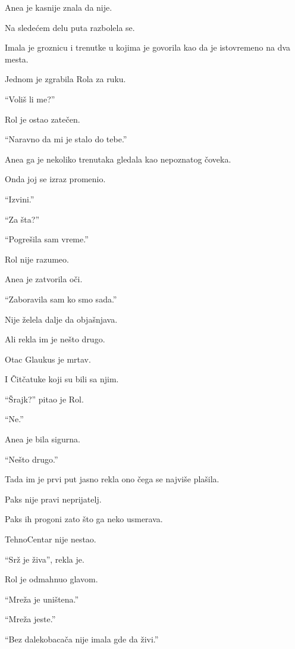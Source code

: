 Anea je kasnije znala da nije.

\bigskip

Na sledećem delu puta razbolela se.

Imala je groznicu i trenutke u kojima je govorila kao da je istovremeno na dva mesta.

Jednom je zgrabila Rola za ruku.

``Voliš li me?''

Rol je ostao zatečen.

``Naravno da mi je stalo do tebe.''

Anea ga je nekoliko trenutaka gledala kao nepoznatog čoveka.

Onda joj se izraz promenio.

``Izvini.''

``Za šta?''

``Pogrešila sam vreme.''

\bigskip

Rol nije razumeo.

Anea je zatvorila oči.

``Zaboravila sam ko smo sada.''

\bigskip

Nije želela dalje da objašnjava.

Ali rekla im je nešto drugo.

Otac Glaukus je mrtav.

I Čitčatuke koji su bili sa njim.

\bigskip

``Šrajk?'' pitao je Rol.

``Ne.''

Anea je bila sigurna.

``Nešto drugo.''

\bigskip

Tada im je prvi put jasno rekla ono čega se najviše plašila.

Paks nije pravi neprijatelj.

Paks ih progoni zato što ga neko usmerava.

\bigskip

TehnoCentar nije nestao.

\bigskip

``Srž je živa'', rekla je.

Rol je odmahnuo glavom.

``Mreža je uništena.''

``Mreža jeste.''

``Bez dalekobacača nije imala gde da živi.''

